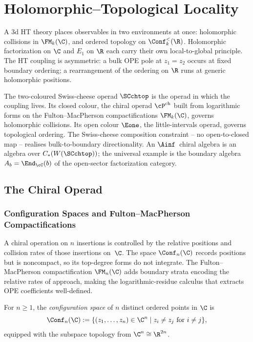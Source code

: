 \section{Holomorphic--Topological Locality}
\label{sec:HT-operad}

A 3d HT theory places observables in two environments at once:
holomorphic collisions in $\FM_k(\C)$, and ordered topology on
$\Conf_k^<(\R)$. Holomorphic factorization on $\C$ and $E_1$ on $\R$
each carry their own local-to-global principle. The HT coupling is
asymmetric: a bulk OPE pole at $z_1 = z_2$ occurs at fixed
boundary ordering; a rearrangement of the ordering on $\R$ runs at
generic holomorphic positions.

The two-coloured Swiss-cheese operad $\SCchtop$ is the operad in
which the coupling lives. Its closed colour, the chiral operad
$\cP^{\mathrm{ch}}$ built from logarithmic forms on the
Fulton--MacPherson compactifications $\FM_k(\C)$, governs
holomorphic collisions. Its open colour $\Eone$, the
little-intervals operad, governs topological ordering. The
Swiss-cheese composition constraint -- no open-to-closed map --
realises bulk-to-boundary directionality. An $\Ainf$~chiral algebra
is an algebra over $C_\ast(W(\SCchtop))$; the universal example is
the boundary algebra $A_b = \End_\cC(b)$ of the open-sector
factorization category.

\subsection{The Chiral Operad}
\label{sec:chiral_operad}

\subsubsection{Configuration Spaces and Fulton--MacPherson Compactifications}

A chiral operation on $n$ insertions is controlled by the relative
positions and collision rates of those insertions on~$\C$. The
space $\Conf_n(\C)$ records positions but is noncompact, so its
top-degree forms do not integrate. The Fulton--MacPherson
compactification $\FM_n(\C)$ adds boundary strata encoding the
relative rates of approach, making the logarithmic-residue calculus
that extracts OPE coefficients well-defined.

\begin{definition}
For $n \geq 1$, the \emph{configuration space} of $n$ distinct ordered points in $\C$ is
\[
\Conf_n(\C) := \{(z_1,\ldots,z_n) \in \C^n \mid z_i \neq z_j \text{ for } i \neq j\},
\]
equipped with the subspace topology from $\C^n \cong \R^{2n}$.
\end{definition}

